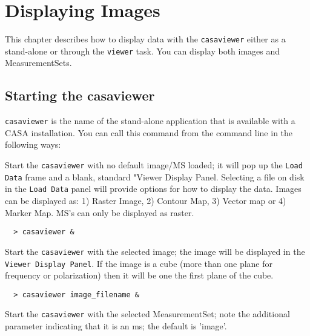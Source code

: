 

\chapter{Displaying Images}
\label{chapter:viewer}

This chapter describes how to display data with the {\tt casaviewer}
either as a stand-alone or through the {\tt viewer} task. You can
display both images and MeasurementSets.

\section{Starting the casaviewer}
\label{section:viewer.start}

{\tt casaviewer} is the name of the stand-alone application that is
available with a CASA installation. You can call this command from the
command line in the following ways:

Start the {\tt casaviewer} with no default image/MS loaded; it will
pop up the {\tt Load Data} frame and a blank, standard "Viewer Display
Panel. Selecting a file on disk in the {\tt Load Data} panel will
provide options for how to display the data. Images can be displayed
as: 1) Raster Image, 2) Contour Map, 3) Vector map or 4) Marker
Map.  MS's can only be displayed as raster.

\small
\begin{verbatim}
  > casaviewer &
\end{verbatim}
\normalsize

Start the {\tt casaviewer} with the selected image; the image will be
displayed in the {\tt Viewer Display Panel}. If the image is a cube (more
than one plane for frequency or polarization) then it will be one the
first plane of the cube.

\small
\begin{verbatim}
  > casaviewer image_filename &
\end{verbatim}
\normalsize

Start the {\tt casaviewer} with the selected MeasurementSet; note the
additional parameter indicating that it is an ms; the default is
'image'.

